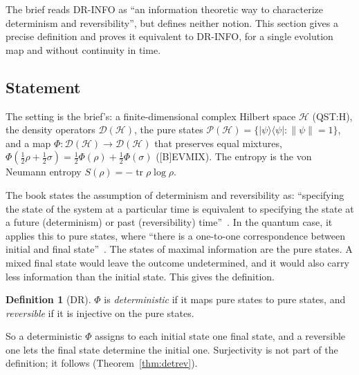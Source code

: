 \documentclass[11pt]{article}
\theoremstyle{definition}
\newtheorem{definition}[theorem]{Definition}
\theoremstyle{remark}
\begin{document}
The brief reads DR-INFO as ``an information theoretic way to characterize determinism and
reversibility'', but defines neither notion. This section gives a precise definition and proves
it equivalent to DR-INFO, for a single evolution map and without continuity in time.

\subsection{Statement}

The setting is the brief's: a finite-dimensional complex Hilbert space $\mathcal H$ (QST:H), the
density operators $\mathcal D(\mathcal H)$, the pure states
$\mathcal P(\mathcal H) = \{|\psi\rangle\langle\psi| : \|\psi\| = 1\}$, and a map
$\Phi\colon\mathcal D(\mathcal H)\to\mathcal D(\mathcal H)$ that preserves equal mixtures,
$\Phi(\frac12\rho + \frac12\sigma) = \frac12\Phi(\rho) + \frac12\Phi(\sigma)$ ([B]EVMIX). The
entropy is the von Neumann entropy $S(\rho) = -\operatorname{tr}\rho\log\rho$.

The book states the assumption of determinism and reversibility as: ``specifying the state of
the system at a particular time is equivalent to specifying the state at a future (determinism)
or past (reversibility) time''~\cite[Ch.~\emph{Classical mechanics}, Sec.~\emph{Reversing
Hamiltonian mechanics}]{book}. In the quantum case, it applies this to pure states, where ``there is a
one-to-one correspondence between initial and final state''~\cite[Ch.~\emph{Quantum mechanics},
Sec.~\emph{Schroedinger equation and unitary evolution}]{book}. The states of maximal
information are the pure states. A mixed final state would leave the outcome undetermined, and
it would also carry less information than the initial state. This gives the definition.

\begin{definition}[DR]\label{def:detrev}
  $\Phi$ is \emph{deterministic} if it maps pure states to pure states, and \emph{reversible} if
  it is injective on the pure states.
\end{definition}

So a deterministic $\Phi$ assigns to each initial state one final state, and a reversible one
lets the final state determine the initial one. Surjectivity is not part of the definition; it
follows (Theorem~\ref{thm:detrev}).
\end{document}
